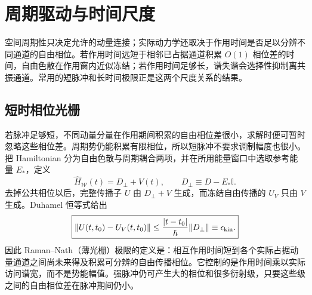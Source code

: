 \section{周期驱动与时间尺度}

空间周期性只决定允许的动量连接；实际动力学还取决于作用时间是否足以分辨不同通道的自由相位。若作用时间远短于相邻已占据通道积累 $O(1)$ 相位差的时间，自由色散在作用窗内近似冻结；若作用时间足够长，谱失谐会选择性抑制离共振通道。常用的短脉冲和长时间极限正是这两个尺度关系的结果。

\subsection{短时相位光栅}

若脉冲足够短，不同动量分量在作用期间积累的自由相位差很小，求解时便可暂时忽略这些相位差。周期势仍能积累有限相位，所以短脉冲不要求调制幅度也很小。把 Hamiltonian 分为自由色散与周期耦合两项，并在所用能量窗口中选取参考能量 $E_*$，定义
\begin{equation}
\boxed{
\hat H_{\mathcal W}(t)=D_\perp+V(t),
\qquad
D_\perp\equiv D-E_*\mathbb I.}
\label{eq:periodic_window_hamiltonian_decomposition}
\end{equation}
去掉公共相位以后，完整传播子 $U$ 由 $D_\perp+V$ 生成，而冻结自由传播的 $U_V$ 只由 $V$ 生成。Duhamel 恒等式给出
\begin{equation}
\boxed{
\|U(t,t_0)-U_V(t,t_0)\|
\le\frac{|t-t_0|}{\hbar}\|D_\perp\|
\equiv\epsilon_{\rm kin}.}
\label{eq:raman_nath_duhamel_bound}
\end{equation}
因此 Raman--Nath（薄光栅）极限的定义是：相互作用时间短到各个实际占据动量通道之间尚未来得及积累可分辨的自由传播相位。它控制的是作用时间乘以实际访问谱宽，而不是势能幅值。强脉冲仍可产生大的相位和很多衍射级，只要这些级之间的自由相位差在脉冲期间仍小。

